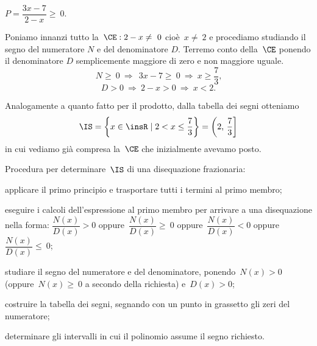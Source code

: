 \begin{exrig}
 \begin{esempio}
 $P=\dfrac{3x-7}{2-x}\ge~0$.

 Poniamo innanzi tutto la~$\CE: 2-x\neq~0$
 cioè~$x\neq~2$ e procediamo studiando il segno del
numeratore $N$ e del denominatore $D$. Terremo conto della~$\CE$ ponendo il
denominatore $D$ semplicemente maggiore di zero e non maggiore uguale.
\[N\ge~0\:\Rightarrow\:~3x-7\ge~0\:\Rightarrow\: x\ge \frac{7}{3}\text{,}\]
\[D>0\:\Rightarrow\: 2-x>0\:\Rightarrow\: x<2.\]
\begin{center}

\end{center}

Analogamente a quanto fatto per il prodotto, dalla tabella dei segni otteniamo
\[\IS=\left\{x\in \insR\mid 2<x\le \frac{7}{3}\right\}=\left(2\text{,~}\frac{7}{3}\right]\]
in cui vediamo già compresa la~$\CE$ che inizialmente avevamo posto.
 \end{esempio}
\end{exrig}

\begin{procedura}
 Procedura per determinare~$\IS$ di una disequazione frazionaria:

\begin{enumeratea}
\item applicare il primo principio e trasportare tutti i termini al primo membro;
 \item eseguire i calcoli dell'espressione al primo membro per arrivare a una disequazione nella forma:
 \subitem $\dfrac{N(x)}{D(x)}>0$ oppure~$\dfrac{N(x)}{D(x)}\ge~0$ oppure~$\dfrac{N(x)}{D(x)}<0$ oppure~$\dfrac{N(x)}{D(x)}\le~0$;
 \item studiare il segno del numeratore e del denominatore, ponendo~$N(x)>0$ (oppure~$N(x)\geq~0$ a secondo della richiesta) e~$D(x)>0$;
 \item costruire la tabella dei segni, segnando con un punto in grassetto gli zeri del numeratore;
 \item determinare gli intervalli in cui il polinomio assume il segno richiesto.
\end{enumeratea}
\end{procedura}

